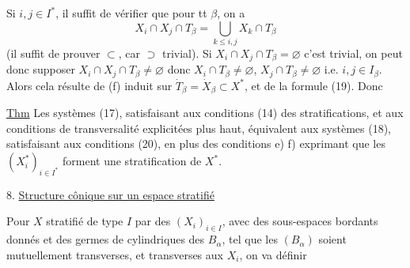 Si $i,j\in I^*$, il suffit 
de vérifier que pour tt
$\beta$, on a
\[
X_i\cap X_j\cap T_\beta=\bigcup_{k\le i,j}X_k\cap T_\beta
\]
(il suffit de prouver $\subset$, car $\supset$ trivial). Si
$X_i\cap X_j\cap T_\beta=\varnothing$ c'est trivial, on peut donc supposer
$X_i\cap X_j\cap T_\beta\ne\varnothing$
donc $X_i\cap T_\beta\ne\varnothing$, $X_j\cap T_\beta\ne\varnothing$
i.e. $i,j\in I_\beta$. Alors  cela résulte de
(f) induit sur $\dot T_\beta=\dot X_\beta\subset X^*$,
et de la formule (19). Donc

\uline{Thm} Les systèmes (17), satisfaisant aux
conditions  (14) des stratifications, et aux
conditions de transversalité explicitées plus
haut, équivalent aux systèmes (18), satisfaisant
aux conditions (20), en plus des conditions
e) f) exprimant que les $(X_i^*)_{i\in I^*}$ forment une
stratification de $X^*$.

8. \uline{Structure cônique sur un espace stratifié}

Pour $X$ stratifié de type $I$ par des
$(X_i)_{i\in I}$, avec des sous-espaces bordants donnés
et des germes de  cylindriques des $B_\alpha$, tel que
les $(B_\alpha)$ soient mutuellement transverses, et
transverses aux $X_i$, on va  définir

